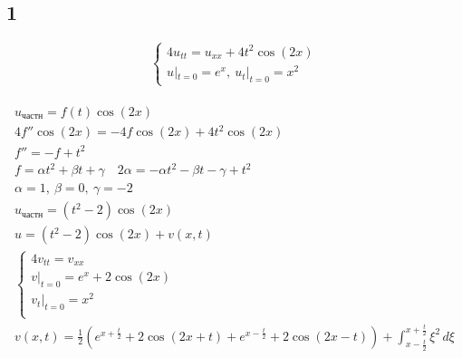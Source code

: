 \subsection{1}
\[
\begin{cases}
 4u_{tt} = u_{xx}+4t^{2} \cos(2x) \\ u|_{t=0} = e^{x}, \ u_{t}|_{t=0} = x^{2} 
\end{cases}
\] \\
\begin{gather*}
  u_{\text{частн}}= f(t) \cos(2x) \\ 
  4f'' \cos(2x) = -4f \cos(2x) +4t^{2} \cos(2x) \\ 
  f''=-f+t^{2} \\
  f = \alpha t^{2} + \beta t + \gamma \quad 2\alpha=-\alpha t^{2} - \beta t - \gamma + t^{2}\\ 
  \alpha = 1, \ \beta = 0, \ \gamma = -2 \\
  u_{\text{частн}} = (t^{2}-2) \cos(2x) \\
  u = (t^{2}-2)\cos(2x) + v(x,t) \\
  \begin{cases}
   4v_{tt}=v_{xx} \\ v|_{t=0}=e^{x}+2\cos(2x) \\ v_{t}|_{t=0} = x^{2} \\
  \end{cases} \\
  \boxed{v(x,t)= \frac{1}{2}(e^{x + \frac{t}{2}}+2\cos(2x+t)+e^{x -\frac{t}{2} }+2\cos(2x-t))
  + \int_{x- \frac{t}{2}}^{x +\frac{t}{2}} \xi^{2} \,d\xi} \\
\end{gather*}

